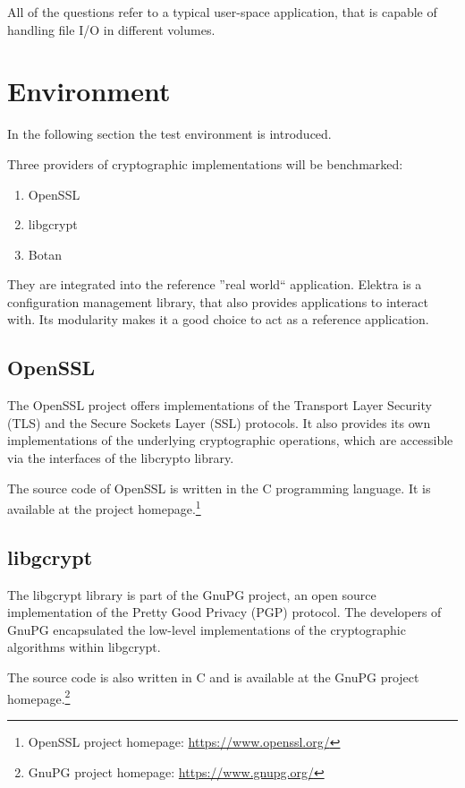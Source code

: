All of the questions refer to a typical user-space application, that is capable of handling file I/O in different volumes.

\section{Environment}

In the following section the test environment is introduced.

Three providers of cryptographic implementations will be benchmarked:

\begin{enumerate}
\item OpenSSL
\item libgcrypt
\item Botan
\end{enumerate}

They are integrated into the reference ''real world`` application.
Elektra is a configuration management library, that also provides applications to interact with.
Its modularity makes it a good choice to act as a reference application.

	\subsection{OpenSSL}

The OpenSSL project offers implementations of the Transport Layer Security (TLS) and the Secure Sockets Layer (SSL) protocols.
It also provides its own implementations of the underlying cryptographic operations, which are accessible via the interfaces of the libcrypto library.

The source code of OpenSSL is written in the C programming language.
It is available at the project homepage.\footnote{OpenSSL project homepage: \url{https://www.openssl.org/}}

	\subsection{libgcrypt}

The libgcrypt library is part of the GnuPG project, an open source implementation of the Pretty Good Privacy (PGP) protocol.
The developers of GnuPG encapsulated the low-level implementations of the cryptographic algorithms within libgcrypt.

The source code is also written in C and is available at the GnuPG project homepage.\footnote{GnuPG project homepage: \url{https://www.gnupg.org/}}

